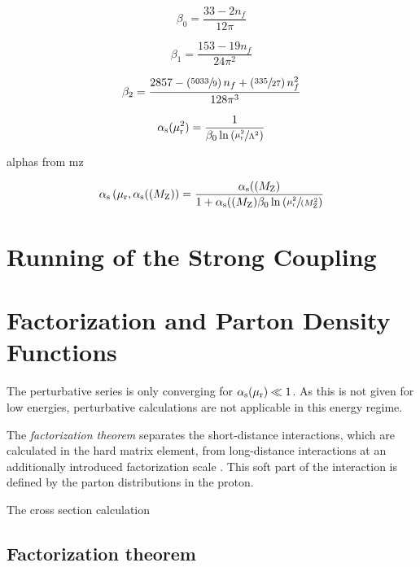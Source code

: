 \begin{equation} 
    \beta_0 = \frac{33 - 2 n_f}{12\pi}
\end{equation}

\begin{equation} 
    \beta_1 = \frac{153 - 19 n_f}{24\pi^2}
\end{equation}

\begin{equation} 
   \beta_2 = \frac{2857 -\left(\sfrac{5033}{9}\right)n_f + \left(\sfrac{335}{27}
   \right)n_f^2}{128 \pi^3}
\end{equation}

\begin{equation*}
   \alpha_\mathrm{s}(\mu_{\mathrm{r}}^2) = \frac{1}{\beta_0 \ln \left( \sfrac{\mu_{\mathrm{r}}^2}{\Lambda^2} \right)}
\end{equation*}


alphas from mz

\begin{equation*}
   \alpha_\mathrm{s}\left(\mu_{\mathrm{r}}, \alpha_\mathrm{s}((M_\mathrm{Z})\right) = \frac{\alpha_\mathrm{s}((M_\mathrm{Z})}{1 + \alpha_\mathrm{s}((M_\mathrm{Z})\beta_0 \ln
       \left( \sfrac{\mu_{\mathrm{r}}^2}{(M_\mathrm{Z}^2} \right)}
\end{equation*}



\section{Running of the Strong Coupling}




\section{Factorization and Parton Density Functions}

The perturbative series is only converging for $\alpha_\mathrm{s}(\mu_{\mathrm{r}}) \ll 1$. As this is not
given for low energies, perturbative calculations are not applicable in this
energy regime. 

The \emph{factorization theorem} separates the short-distance interactions,
which are calculated in the hard matrix element, from long-distance
interactions at an additionally introduced factorization scale \muf. This soft
part of the interaction is defined by the parton distributions in the proton.

The cross section calculation 

\subsection{Factorization theorem}


